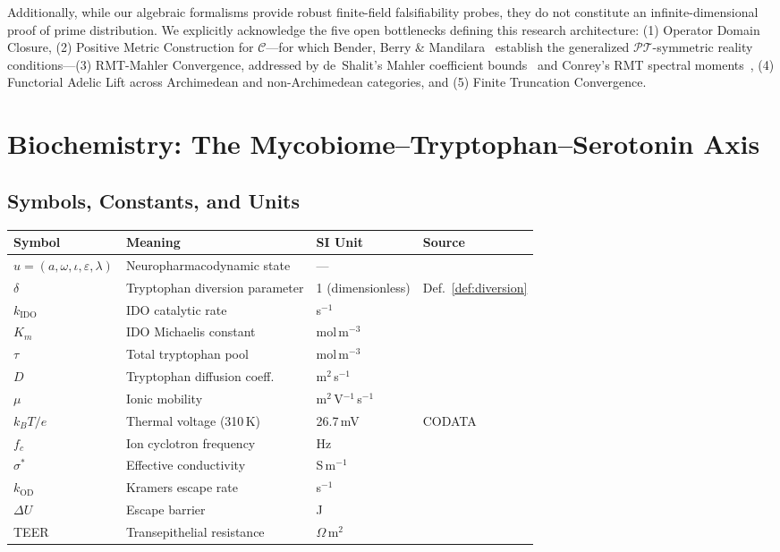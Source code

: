\documentclass[12pt,oneside]{article}
\theoremstyle{principia}
\theoremstyle{definition}
\theoremstyle{remark}
\begin{document}
Additionally, while our algebraic formalisms provide robust finite-field falsifiability probes, they do not constitute an infinite-dimensional proof of prime distribution. We explicitly acknowledge the five open bottlenecks defining this research architecture: (1) Operator Domain Closure, (2) Positive Metric Construction for $\mathcal{C}$---for which Bender, Berry \& Mandilara~\cite{bender-berry-mandilara-12} establish the generalized $\mathcal{PT}$-symmetric reality conditions---(3) RMT-Mahler Convergence, addressed by de~Shalit's Mahler coefficient bounds~\cite{deshalit-mahler-12} and Conrey's RMT spectral moments~\cite{conrey-rmt-12}, (4) Functorial Adelic Lift across Archimedean and non-Archimedean categories, and (5) Finite Truncation Convergence.


\newpage

\section{Biochemistry: The Mycobiome--Tryptophan--Serotonin Axis}

\subsection{Symbols, Constants, and Units}

\begin{center}
\begin{tabular}{@{}llll@{}}
\toprule
Symbol & Meaning & SI Unit & Source \\
\midrule
$u = (a,\omega,\iota,\varepsilon,\lambda)$ & Neuropharmacodynamic state & --- & \cite{mmm05} \\
$\delta$ & Tryptophan diversion parameter & 1 (dimensionless) & Def.~\ref{def:diversion} \\
$k_\mathrm{IDO}$ & IDO catalytic rate & s$^{-1}$ & \cite{sono96} \\
$K_m$ & IDO Michaelis constant & mol\,m$^{-3}$ & \cite{sono96} \\
$\tau$ & Total tryptophan pool & mol\,m$^{-3}$ & \cite{fernstrom71} \\
$D$ & Tryptophan diffusion coeff. & m$^2$\,s$^{-1}$ & \cite{rj2} \\
$\mu$ & Ionic mobility & m$^2$\,V$^{-1}$\,s$^{-1}$ & \cite{rj2} \\
$k_B T/e$ & Thermal voltage (310\,K) & 26.7\,mV & CODATA \\
$f_c$ & Ion cyclotron frequency & Hz & \cite{rj2,rja} \\
$\sigma^*$ & Effective conductivity & S\,m$^{-1}$ & \cite{rj2,rja} \\
$k_\mathrm{OD}$ & Kramers escape rate & s$^{-1}$ & \cite{rj2} \\
$\Delta U$ & Escape barrier & J & \cite{rj2} \\
TEER & Transepithelial resistance & $\Omega$\,m$^2$ & \cite{srinivasan15} \\
\bottomrule
\end{tabular}
\end{center}
\end{document}
